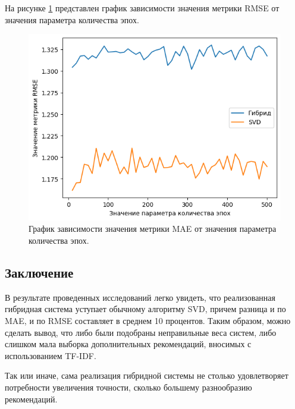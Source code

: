 На рисунке \ref{img:4} представлен график зависимости значения метрики RMSE от значения параметра количества эпох.

\begin{figure}[H]
	\centering
	\includegraphics[width=\textwidth]{inc/4.png}
	\caption{ График зависимости значения метрики MAE от значения параметра количества эпох.}
	\label{img:4}
\end{figure}


\subsection*{Заключение}

В результате проведенных исследований легко увидеть, что реализованная гибридная система уступает обычному алгоритму SVD, причем разница и по MAE, и по RMSE составляет в среднем 10 процентов. Таким образом, можно сделать вывод, что либо были подобраны неправильные веса систем, либо слишком мала выборка дополнительных рекомендаций, вносимых с использованием TF-IDF.

Так или иначе, сама реализация гибридной системы не столько удовлетворяет потребности увеличения точности, сколько большему разнообразию рекомендаций.